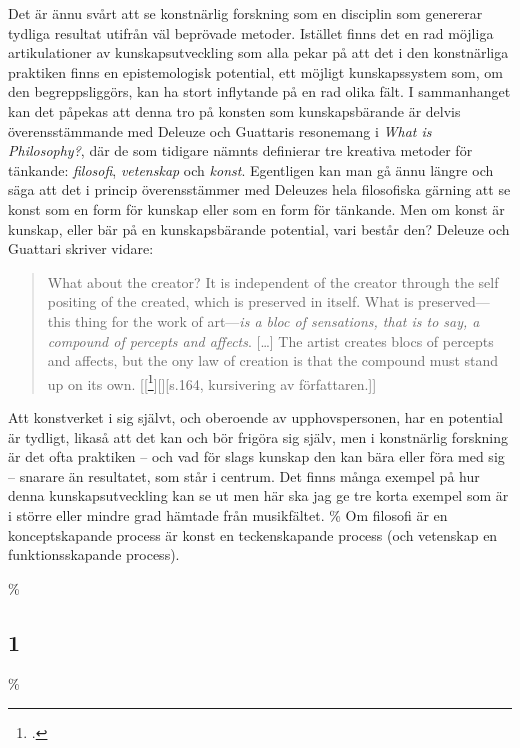 \documentclass[11pt]{article}
\begin{document}
Det är ännu svårt att se konstnärlig forskning som en disciplin som
genererar tydliga resultat utifrån väl beprövade metoder. Istället
finns det en rad möjliga artikulationer av kunskapsutveckling som alla
pekar på att det i den konstnärliga praktiken finns en
epistemologisk potential, ett möjligt kunskapssystem som, om den
begreppsliggörs, kan ha stort inflytande på en rad olika fält. I
sammanhanget kan det påpekas att denna tro på konsten som
kunskapsbärande är delvis överensstämmande med Deleuze och Guattaris
resonemang i \emph{What is Philosophy?}, där de som tidigare nämnts
definierar tre kreativa metoder för tänkande: \emph{filosofi}, \emph{vetenskap} och
\emph{konst}. Egentligen kan man gå ännu längre och säga att det i
princip överensstämmer med Deleuzes hela filosofiska gärning att se
konst som en form för kunskap eller som en form för tänkande. Men om
konst är kunskap, eller bär på en kunskapsbärande potential, vari
består den? Deleuze och Guattari skriver vidare:
\begin{quote}
    What about the creator? It is independent of the creator through
    the self positing of the created, which is preserved in
    itself. What is preserved---this thing for the work of
    art---\emph{is a bloc of sensations, that is to say, a compound of
        percepts and affects}. [\ldots] The artist creates blocs of
    percepts and affects, but the ony law of creation is that the
    compound must stand up on its
    own. [[\footcite{deleuze1994}][][s.164, kursivering av författaren.]]
\end{quote}
Att konstverket i sig självt, och oberoende av upphovspersonen, har en
potential är tydligt, likaså att det kan och bör frigöra sig själv,
men i konstnärlig forskning är det ofta praktiken -- och vad för slags
kunskap den kan bära eller föra med sig -- snarare än resultatet, som
står i centrum. Det finns många exempel på hur denna
kunskapsutveckling kan se ut men här ska jag ge tre korta exempel som
är i större eller mindre grad hämtade från musikfältet.
\% Om filosofi är en konceptskapande process är konst en teckenskapande process (och vetenskap en funktionsskapande process).

\% \subsection*{1}
\% \label{sec:1}
\end{document}
